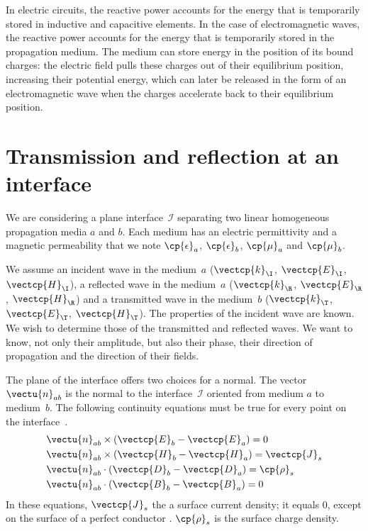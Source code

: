 In electric circuits, the reactive power accounts for the energy that is temporarily stored in inductive and capacitive elements.
In the case of electromagnetic waves, the reactive power accounts for the energy that is temporarily stored in the propagation medium.
The medium can store energy in the position of its bound charges: the electric field pulls these charges out of their equilibrium position, increasing their potential energy, which can later be released in the form of an electromagnetic wave when the charges accelerate back to their equilibrium position.



\FloatBarrier


\section{Transmission and reflection at an interface}
\label{sec:transmission_reflection_interface}

We are considering a plane interface~$\mathcal{I}$ separating two linear homogeneous propagation media $a$ and $b$.
Each medium has an electric permittivity and a magnetic permeability that we note $\cp{\epsilon}_a$, $\cp{\epsilon}_b$, $\cp{\mu}_a$ and $\cp{\mu}_b$.

We assume
an incident wave in the medium~$a$ ($\vectcp{k}_\I$, $\vectcp{E}_\I$, $\vectcp{H}_\I$),
a reflected wave in the medium~$a$ ($\vectcp{k}_\R$, $\vectcp{E}_\R$, $\vectcp{H}_\R$)
and a transmitted wave in the medium~$b$ ($\vectcp{k}_\T$, $\vectcp{E}_\T$, $\vectcp{H}_\T$).
The properties of the incident wave are known.
We wish to determine those of the transmitted and reflected waves.
We want to know, not only their amplitude, but also their phase, their direction of propagation and the direction of their fields.

The plane of the interface offers two choices for a normal.
The vector~$\vectu{n}_{ab}$ is the normal to the interface~$\mathcal{I}$ oriented from medium $a$ to medium~$b$.
The following continuity equations must be true for every point on the interface~\cite{stratton1941electromagnetic}.
\begin{align}
    &\vectu{n}_{ab} \times (\vectcp{E}_b - \vectcp{E}_a) = 0 \\
    &\vectu{n}_{ab} \times (\vectcp{H}_b - \vectcp{H}_a) = \vectcp{J}_s \\
    &\vectu{n}_{ab} \cdot  (\vectcp{D}_b - \vectcp{D}_a) = \cp{\rho}_s \\
    &\vectu{n}_{ab} \cdot  (\vectcp{B}_b - \vectcp{B}_a) = 0
\end{align}
In these equations, $\vectcp{J}_s$ the a surface current density;
it equals 0, except on the surface of a perfect conductor \cite{stratton1941electromagnetic}.
$\cp{\rho}_s$ is the surface charge density.

